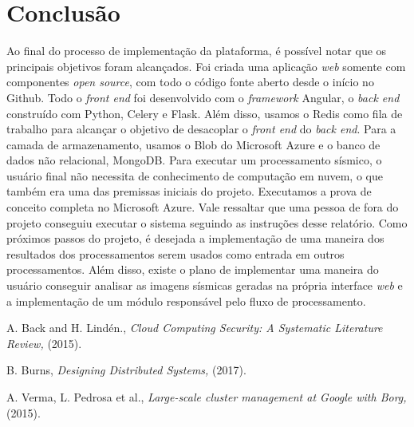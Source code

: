 \documentclass[11pt,twoside]{article}
\begin{document}
\section{Conclusão}
Ao final do processo de implementação da plataforma, é possível notar que os principais objetivos foram alcançados. Foi criada uma aplicação \emph{web} somente com componentes \emph{open source},
com todo o código fonte aberto desde o início no Github. Todo o \emph{front end} foi desenvolvido com o \emph{framework} Angular, o \emph{back end} construído com Python, Celery e
Flask. Além disso, usamos o Redis como fila de trabalho para alcançar o objetivo de desacoplar o \emph{front end} do \emph{back end}. Para a camada de armazenamento, usamos o 
Blob do Microsoft Azure e o banco de dados não relacional, MongoDB.
Para executar um processamento sísmico, o usuário final não necessita de conhecimento de computação em nuvem, o que também era uma das premissas iniciais do projeto.
Executamos a prova de conceito completa no Microsoft Azure. Vale ressaltar que uma pessoa de fora do projeto conseguiu executar o sistema seguindo as instruções desse relatório.
Como próximos passos do projeto, é desejada a implementação de uma maneira dos resultados dos processamentos serem usados como entrada em outros processamentos. Além disso, existe o
plano de implementar uma maneira do usuário conseguir analisar as imagens sísmicas geradas na própria interface \emph{web} e a implementação de um módulo responsável pelo fluxo de
processamento.

\begin{thebibliography}{99}

 A. Back and H. Lindén., {\it Cloud Computing Security: A Systematic Literature Review,} (2015).

 B. Burns, {\it Designing Distributed Systems,} (2017).

 A. Verma, L. Pedrosa  et al., {\it Large-scale cluster management at Google with Borg,} (2015).

\end{thebibliography}
\end{document}
